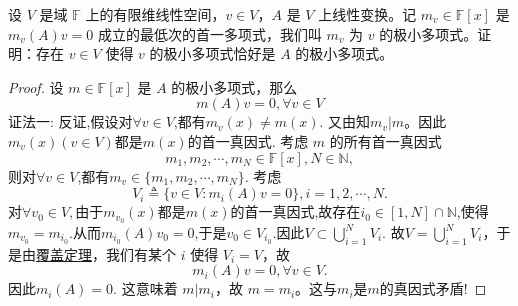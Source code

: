 \documentclass[../../main.tex]{subfiles}
\begin{document}
\begin{example}
设 \( V \) 是域 \( \mathbb{F} \) 上的有限维线性空间，\( v \in V \)，\( A \) 是 \( V \) 上线性变换。记 \( m_v \in \mathbb{F}[x] \) 是 \( m_v(A)v = 0 \) 成立的最低次的首一多项式，我们叫 \( m_v \) 为 \( v \) 的极小多项式。证明：存在 \( v \in V \) 使得 \( v \) 的极小多项式恰好是 \( A \) 的极小多项式。
\end{example}
\begin{proof}
设 \( m \in \mathbb{F}[x] \) 是 \( A \) 的极小多项式，那么
\[
m(A)v = 0, \forall v \in V
\]
{\color{blue}证法一:}
反证,假设对$\forall v\in V$,都有$m_v(x)\ne m(x)$.
又由知\( m_v|m \)。因此$m_v(x)(v\in V)$都是$m(x)$的首一真因式.
考虑 \( m \) 的所有首一真因式
\[
m_1, m_2, \cdots, m_N \in \mathbb{F}[x],N\in\mathbb{N},
\]
则对$\forall v\in V$,都有$m_v\in \{m_1,m_2,\cdots,m_N\}$.
考虑
\[
V_i \triangleq \{ v \in V : m_i(A)v = 0 \}, i = 1, 2, \cdots, N.
\]
对$\forall v_0\in V,$由于$m_{v_0}(x)$都是$m(x)$的首一真因式,故存在$i_0\in [1,N]\cap \mathbb{N}$,使得$m_{v_0}=m_{i_0}$.从而$m_{i_0}(A)v_0=0$,于是$v_0\in V_{i_0}.$因此$V\subset \bigcup_{i=1}^N V_i.$
故\( V = \bigcup_{i=1}^N V_i \)，于是由\hyperref[theorem:覆盖定理]{覆盖定理}，我们有某个 \( i \) 使得 \( V_i = V \)，故$$m_i(A)v=0,\forall v\in V.$$
因此$m_i(A)=0.$
这意味着 \( m | m_i \)，故 \( m = m_i\)。这与$m_i$是$m$的真因式矛盾!

\end{proof}
\end{document}
